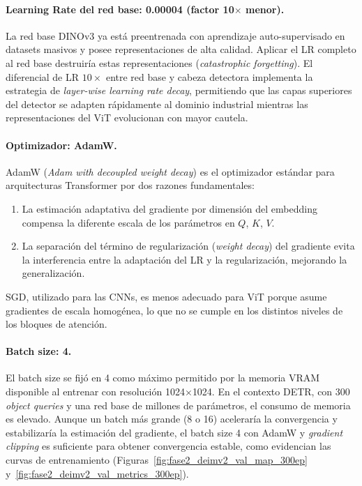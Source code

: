\paragraph{Learning Rate del red base: 0.00004 (factor 10$\times$ menor).}
La red base DINOv3 ya está preentrenada con aprendizaje auto-supervisado en datasets masivos y posee representaciones de alta calidad. Aplicar el LR completo al red base destruiría estas representaciones (\textit{catastrophic forgetting}). El diferencial de LR $10\times$ entre red base y cabeza detectora implementa la estrategia de \textit{layer-wise learning rate decay}, permitiendo que las capas superiores del detector se adapten rápidamente al dominio industrial mientras las representaciones del ViT evolucionan con mayor cautela.

\paragraph{Optimizador: AdamW.}
AdamW (\textit{Adam with decoupled weight decay}) es el optimizador estándar para arquitecturas Transformer por dos razones fundamentales:
\begin{enumerate}
    \item La estimación adaptativa del gradiente por dimensión del embedding compensa la diferente escala de los parámetros en $Q$, $K$, $V$.
    \item La separación del término de regularización (\textit{weight decay}) del gradiente evita la interferencia entre la adaptación del LR y la regularización, mejorando la generalización.
\end{enumerate}
SGD, utilizado para las CNNs, es menos adecuado para ViT porque asume gradientes de escala homogénea, lo que no se cumple en los distintos niveles de los bloques de atención.

\paragraph{Batch size: 4.}
El batch size se fijó en 4 como máximo permitido por la memoria \acrshort{VRAM} disponible al entrenar con resolución 1024$\times$1024. En el contexto DETR, con 300 \textit{object queries} y una red base de millones de parámetros, el consumo de memoria es elevado. Aunque un batch más grande (8 o 16) aceleraría la convergencia y estabilizaría la estimación del gradiente, el batch size 4 con AdamW y \textit{gradient clipping} es suficiente para obtener convergencia estable, como evidencian las curvas de entrenamiento (Figuras~\ref{fig:fase2_deimv2_val_map_300ep} y~\ref{fig:fase2_deimv2_val_metrics_300ep}).

